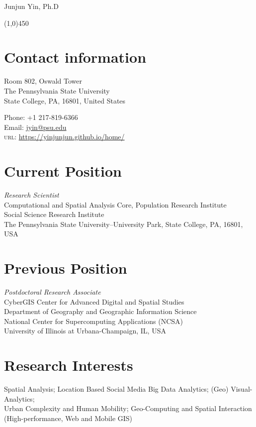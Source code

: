\documentclass[11pt, a4paper]{article}
\begin{document}
{\LARGE Junjun Yin, Ph.D}
\begin{center}
\line(1,0){450}
\end{center}
\section*{Contact information}

\begin{multicols}{2}
 \begin{flushleft}
Room 802, Oswald Tower\\
The Pennsylvania State University\\
State College, PA, 16801, United States
\end{flushleft}
\columnbreak
\begin{flushright}
Phone: +1 217-819-6366\\[.1cm]
Email: \href{mailto:a.jyin@psu.edu}{jyin@psu.edu}\\[.1cm]
\textsc{url}: \href{https://yinjunjun.github.io/home/}{https://yinjunjun.github.io/home/}
\end{flushright}
\end{multicols}

\section*{Current Position}
\emph{Research Scientist}\\
Computational and Spatial Analysis Core, Population Research Institute\\
Social Science Research Institute\\
The Pennsylvania State University--University Park, State College, PA, 16801, USA\\

\section*{Previous Position}
\emph{Postdoctoral Research Associate}\\
CyberGIS Center for Advanced Digital and Spatial Studies\\
Department of Geography and Geographic Information Science\\
National Center for Supercomputing Applications (NCSA)\\
University of Illinois at Urbana-Champaign, IL, USA

\section*{Research Interests}
Spatial Analysis; Location Based Social Media Big Data Analytics; (Geo) Visual-Analytics; \\
Urban Complexity and Human Mobility; Geo-Computing and Spatial Interaction  (High-performance, Web and Mobile GIS)
\end{document}
